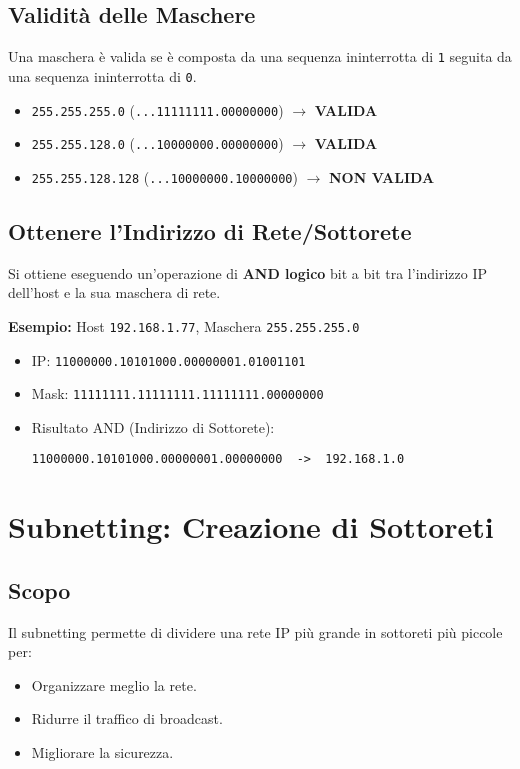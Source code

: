 \subsection{Validità delle Maschere}
Una maschera è valida se è composta da una sequenza ininterrotta di \texttt{1} seguita da una sequenza ininterrotta di \texttt{0}.
\begin{itemize}
    \item \texttt{255.255.255.0} (\texttt{...11111111.00000000}) $\rightarrow$ \textbf{VALIDA}
    \item \texttt{255.255.128.0} (\texttt{...10000000.00000000}) $\rightarrow$ \textbf{VALIDA}
    \item \texttt{255.255.128.128} (\texttt{...10000000.10000000}) $\rightarrow$ \textbf{NON VALIDA}
\end{itemize}

\subsection{Ottenere l'Indirizzo di Rete/Sottorete}
Si ottiene eseguendo un'operazione di \textbf{AND logico} bit a bit tra l'indirizzo IP dell'host e la sua maschera di rete.

\textbf{Esempio:} Host \texttt{192.168.1.77}, Maschera \texttt{255.255.255.0}
\begin{itemize}
    \item IP: \texttt{11000000.10101000.00000001.01001101}
    \item Mask: \texttt{11111111.11111111.11111111.00000000}
    \item Risultato AND (Indirizzo di Sottorete):
    \begin{verbatim}
11000000.10101000.00000001.00000000  ->  192.168.1.0
    \end{verbatim}
\end{itemize}

\section{Subnetting: Creazione di Sottoreti}

\subsection{Scopo}
Il subnetting permette di dividere una rete IP più grande in sottoreti più piccole per:
\begin{itemize}
    \item Organizzare meglio la rete.
    \item Ridurre il traffico di broadcast.
    \item Migliorare la sicurezza.
\end{itemize}

